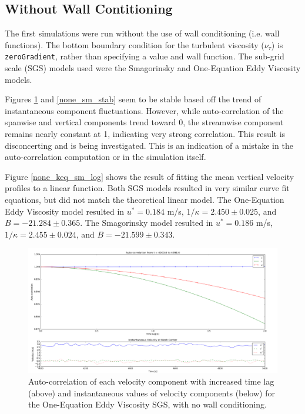 \documentclass[12pt]{article}
\begin{document}
\subsection{Without Wall Contitioning}
The first simulations were run without the use of wall conditioning (i.e. wall functions).  The bottom boundary condition for the turbulent viscosity ($\nu_\tau$) is \texttt{zeroGradient}, rather than specifying a value and wall function.  The sub-grid scale (SGS) models used were the Smagorinsky and One-Equation Eddy Viscosity models.

Figures \ref{none_keq_stab} and \ref{none_sm_stab} seem to be stable based off the trend of instantaneous component fluctuations.  However, while auto-correlation of the spanwise and vertical components trend toward 0, the streamwise component remains nearly constant at 1, indicating very strong correlation.  This result is disconcerting and is being investigated.  This is an indication of a mistake in the auto-correlation computation or in the simulation itself.

Figure \ref{none_keq_sm_log} shows the result of fitting the mean vertical velocity profiles to a linear function.  Both SGS models resulted in very similar curve fit equations, but did not match the theoretical linear model.  The One-Equation Eddy Viscosity model resulted in $u^* = 0.184$ m/s, $1/\kappa = 2.450 \pm 0.025$, and $B = -21.284 \pm 0.365$.  The Smagorinsky model resulted in $u^* = 0.186$ m/s, $1/\kappa = 2.455 \pm 0.024$, and $B = -21.599 \pm 0.343$.

\begin{figure}[H]
\centering
\includegraphics[scale=0.35]{none/keq_stability.png}
\caption{Auto-correlation of each velocity component with increased time lag (above) and instantaneous values of velocity components (below) for the One-Equation Eddy Viscosity SGS, with no wall conditioning.}
\label{none_keq_stab}
\end{figure}
  
\end{document}
